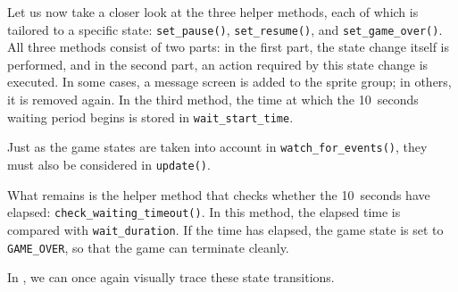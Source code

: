 
Let us now take a closer look at the three helper methods, each of which is tailored to a specific state: \texttt{set\_pause()}, \texttt{set\_resume()}, and \texttt{set\_game\_over()}. All three methods consist of two parts: in the first part, the state change itself is performed, and in the second part, an action required by this state change is executed. In some cases, a message screen is added to the sprite group; in others, it is removed again. In the third method, the time at which the \SI{10}{seconds} waiting period begins is stored in \texttt{wait\_start\_time}.


Just as the game states are taken into account in \texttt{watch\_for\_events()}, they must also be considered in \texttt{update()}.


What remains is the helper method that checks whether the \SI{10}{seconds} have elapsed: \texttt{check\_waiting\_timeout()}. In this method, the elapsed time is compared with \texttt{wait\_du\-ra\-tion}. If the time has elapsed, the game state is set to \texttt{GAME\_OVER}, so that the game can terminate cleanly.


In , we can once again visually trace these state transitions.

